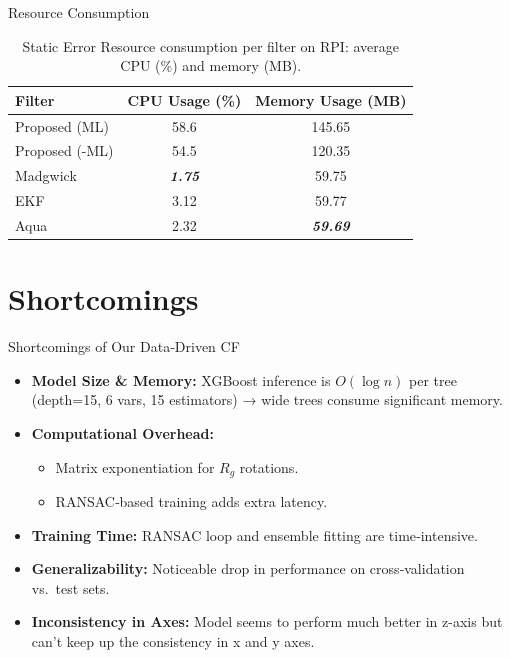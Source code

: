 \documentclass[aspectratio=169,xcolor=dvipsnames]{beamer}
\begin{document}
\begin{frame}{Resource Consumption}
\small
\begin{table}[H]
  \centering
  \caption{Static Error Resource consumption per filter on RPI: average CPU (\%) and memory (MB).}
  \label{tab:resource_consumption_static}
  \begin{tabular}{lcc}
    \toprule
    Filter & CPU Usage (\%) & Memory Usage (MB) \\
    \midrule
    Proposed (ML)     & 58.6 & 145.65 \\
    Proposed (-ML)    & 54.5 & 120.35 \\
    Madgwick           & \textbf{\textit{1.75}} & 59.75 \\
    EKF                & 3.12 & 59.77 \\
    Aqua               & 2.32 & \textbf{\textit{59.69}} \\
    \bottomrule
  \end{tabular}
\end{table}
    
\end{frame}


\section{Shortcomings}

\begin{frame}{Shortcomings of Our Data‐Driven CF}
\begin{itemize}
  \item \textbf{Model Size \& Memory:}
    XGBoost inference is $O(\log n)$ per tree (depth=15, 6 vars, 15 estimators) → wide trees consume significant memory.
  \item \textbf{Computational Overhead:}
    \begin{itemize}
      \item Matrix exponentiation for $R_g$ rotations.
      \item RANSAC‐based training adds extra latency.
    \end{itemize}
  \item \textbf{Training Time:}
    RANSAC loop and ensemble fitting are time‐intensive.
  \item \textbf{Generalizability:}
    Noticeable drop in performance on cross‐validation vs.\ test sets.
  \item \textbf{Inconsistency in Axes:}
    Model seems to perform much better in z-axis but can't keep up the consistency in x and y axes.
\end{itemize}
\end{frame}
\end{document}
